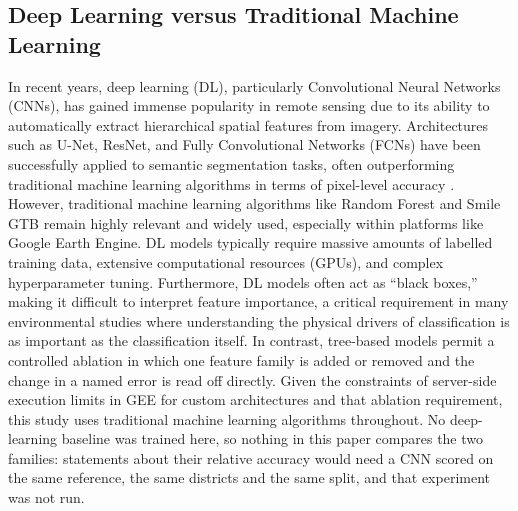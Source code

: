 \documentclass[conference]{IEEEtran}
\begin{document}
\subsection{Deep Learning versus Traditional Machine Learning}
In recent years, deep learning (DL), particularly Convolutional Neural Networks (CNNs), has gained immense popularity in remote sensing due to its ability to automatically extract hierarchical spatial features from imagery. Architectures such as U-Net, ResNet, and Fully Convolutional Networks (FCNs) have been successfully applied to semantic segmentation tasks, often outperforming traditional machine learning algorithms in terms of pixel-level accuracy \cite{r15}. 
However, traditional machine learning algorithms like Random Forest and Smile GTB remain highly relevant and widely used, especially within platforms like Google Earth Engine. DL models typically require massive amounts of labelled training data, extensive computational resources (GPUs), and complex hyperparameter tuning. Furthermore, DL models often act as ``black boxes,'' making it difficult to interpret feature importance, a critical requirement in many environmental studies where understanding the physical drivers of classification is as important as the classification itself.
In contrast, tree-based models permit a controlled ablation in which one feature family is added or removed and the change in a named error is read off directly. Given the constraints of server-side execution limits in GEE for custom architectures and that ablation requirement, this study uses traditional machine learning algorithms throughout. No deep-learning baseline was trained here, so nothing in this paper compares the two families: statements about their relative accuracy would need a CNN scored on the same reference, the same districts and the same split, and that experiment was not run.
\end{document}
